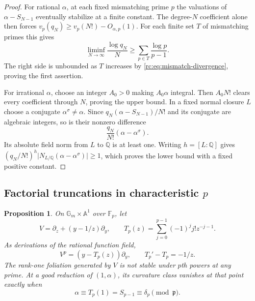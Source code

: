 \documentclass[11pt,a4paper]{article}
\newtheorem{proposition}[theorem]{Proposition}
\theoremstyle{definition}
\theoremstyle{remark}
\theoremstyle{plain}
\numberwithin{equation}{section}
\providecommand{\rcQ}{\mathbb Q}
\begin{document}
\begin{proof}
For rational $\alpha$, at each fixed mismatching prime $p$ the valuations
of $\alpha-S_{N-1}$ eventually stabilize at a finite constant.  The
degree-$N$ coefficient alone then forces
$v_p(q_N)\ge v_p(N!)-O_{\alpha,p}(1)$.  For each finite set $T$ of
mismatching primes this gives
\[
 \liminf_{N\to\infty}\frac{\log q_N}{N}
 \ge\sum_{p\in T}\frac{\log p}{p-1}.
\]
The right side is unbounded as $T$ increases by
\eqref{rc:eq:mismatch-divergence}, proving the first assertion.

For irrational $\alpha$, choose an integer $A_0>0$ making $A_0\alpha$
integral.  Then $A_0N!$ clears every coefficient through $N$, proving
the upper bound.  In a fixed normal closure $L$ choose a conjugate
$\alpha^\sigma\ne\alpha$.  Since
$q_N(\alpha-S_{N-1})/N!$ and its conjugate are algebraic integers,
so is their nonzero difference
\[
 \frac{q_N}{N!}(\alpha-\alpha^\sigma).
\]
Its absolute field norm from $L$ to $\rcQ$ is at least one.  Writing
$h=[L:\rcQ]$ gives
$(q_N/N!)^h\lvert N_{L/\rcQ}(\alpha-\alpha^\sigma)\rvert\ge1$,
which proves the lower bound with a fixed positive constant.
\end{proof}

\subsection{Factorial truncations in characteristic \texorpdfstring{$p$}{p}}

\begin{proposition}\label{rc:prop:pcurvature}
On $\mathbb G_m\times\mathbb A^1$ over $\mathbb F_p$, let
\[
 V=\partial_z+(y-1/z)\partial_y,
 \qquad T_p(z)=\sum_{j=0}^{p-1}(-1)^jj!z^{-j-1}.
\]
As derivations of the rational function field,
\begin{equation}\label{rc:eq:pcurvature}
 V^p=(y-T_p(z))\partial_y,
 \qquad T_p'-T_p=-1/z.
\end{equation}
The rank-one foliation generated by $V$ is not stable under $p$th powers
at any prime.  At a good reduction of $(1,\alpha)$, its curvature class
vanishes at that point exactly when
\begin{equation}\label{rc:eq:pointwise-congruence}
 \alpha\equiv T_p(1)=S_{p-1}\equiv\delta_p\pmod{\mathfrak p}.
\end{equation}
\end{proposition}
\end{document}
